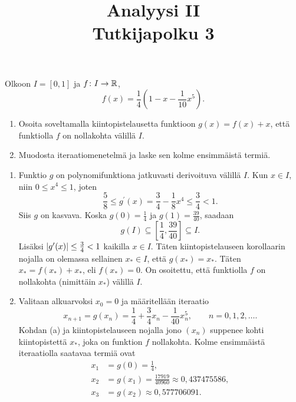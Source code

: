 \documentclass[11pt,a4paper]{amsart}
\title{Analyysi II\\Tutkijapolku 3}
\author{}
\date{}
\begin{document}

\begin{exercise}
  Olkoon \(I = [0, 1]\) ja \(f \colon I \to \mathbb{R}\),
  \[
    f(x) = \frac{1}{4}\left(1 - x - \frac{1}{10}x^5\right).
  \]
  \begin{enumerate}[label=(\alph*)]
    \item Osoita soveltamalla kiintopistelausetta funktioon
      \(g(x) = f(x) + x\), että funktiolla \(f\) on nollakohta välillä \(I\).
    \item Muodosta iteraatiomenetelmä ja laske sen kolme ensimmäistä termiä.
  \end{enumerate}
\end{exercise}

\begin{solution}
  \leavevmode\par
  \begin{enumerate}[label=(\alph*), nosep]
    \item Funktio \(g\) on polynomifunktiona jatkuvasti derivoituva välillä
      \(I\). Kun \(x \in I\), niin \(0 \leq x^4 \leq 1\), joten
      \[
        \frac{5}{8} \leq g^{\prime}(x)
        = \frac{3}{4} - \frac{1}{8}x^4 \leq \frac{3}{4} < 1.
      \]
      Siis \(g\) on kasvava. Koska \(g(0) = \frac{1}{4}\) ja
      \(g(1) = \frac{39}{40}\), saadaan
      \[
        g(I) \subseteq \left[\frac{1}{4}, \frac{39}{40}\right] \subseteq I.
      \]
      Lisäksi \(\lvert g^{\prime}(x)\rvert \leq \frac{3}{4} < 1\) kaikilla
      \(x \in I\). Täten kiintopistelauseen korollaarin nojalla
      on olemassa sellainen \(x_* \in I\), että \(g(x_*) = x_*\). Täten
      \(x_* = f(x_*) + x_*\), eli \(f(x_*) = 0\). On osoitettu, että
      funktiolla \(f\) on nollakohta (nimittäin \(x_*\)) välillä \(I\).
    \item Valitaan alkuarvoksi \(x_0 = 0\) ja määritellään iteraatio
      \[
        x_{n+1} = g(x_n)
        = \frac{1}{4} + \frac{3}{4}x_n - \frac{1}{40}x_n^5,
        \qquad n = 0, 1, 2, \ldots.
      \]
      Kohdan (a) ja kiintopistelauseen nojalla jono \((x_n)\) suppenee
      kohti kiintopistettä \(x_*\), joka on funktion \(f\) nollakohta.
      Kolme ensimmäistä iteraatiolla saatavaa termiä ovat
      \begin{align*}
        x_1 &= g(0) = \frac{1}{4}, \\
        x_2 &= g(x_1) = \frac{17919}{40960} \approx 0{,}437475586, \\
        x_3 &= g(x_2) \approx 0{,}577706091.
      \end{align*}
  \end{enumerate}
\end{solution}
\end{document}

